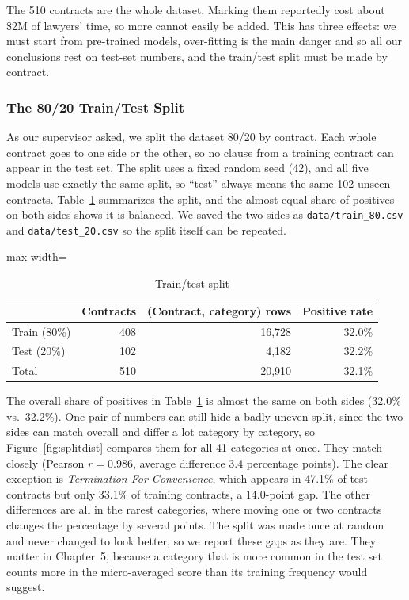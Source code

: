 The 510 contracts are the whole dataset. Marking them reportedly cost about \$2M of lawyers' time, so more cannot easily be added. This has three effects: we must start from pre-trained models, over-fitting is the main danger and so all our conclusions rest on test-set numbers, and the train/test split must be made by contract.

\subsubsection{The 80/20 Train/Test Split}
As our supervisor asked, we split the dataset 80/20 by contract. Each whole contract goes to one side or the other, so no clause from a training contract can appear in the test set. The split uses a fixed random seed (42), and all five models use exactly the same split, so ``test'' always means the same 102 unseen contracts. Table~\ref{tab:split} summarizes the split, and the almost equal share of positives on both sides shows it is balanced. We saved the two sides as \texttt{data/train\_80.csv} and \texttt{data/test\_20.csv} so the split itself can be repeated.

\begin{table}[ht]
\centering
\caption{Train/test split}
\label{tab:split}
\begin{adjustbox}{max width=\textwidth}
\begin{tabular}{lrrr}
\toprule
 & \textbf{Contracts} & \textbf{(Contract, category) rows} & \textbf{Positive rate}\\
\midrule
Train (80\%) & 408 & 16{,}728 & 32.0\%\\
Test (20\%)  & 102 & 4{,}182  & 32.2\%\\
\midrule
Total        & 510 & 20{,}910 & 32.1\%\\
\bottomrule
\end{tabular}
\end{adjustbox}
\end{table}

The overall share of positives in Table~\ref{tab:split} is almost the same on both sides (32.0\% vs.\ 32.2\%). One pair of numbers can still hide a badly uneven split, since the two sides can match overall and differ a lot category by category, so Figure~\ref{fig:splitdist} compares them for all 41 categories at once. They match closely (Pearson $r = 0.986$, average difference 3.4 percentage points). The clear exception is \emph{Termination For Convenience}, which appears in 47.1\% of test contracts but only 33.1\% of training contracts, a 14.0-point gap. The other differences are all in the rarest categories, where moving one or two contracts changes the percentage by several points. The split was made once at random and never changed to look better, so we report these gaps as they are. They matter in Chapter~5, because a category that is more common in the test set counts more in the micro-averaged score than its training frequency would suggest.


